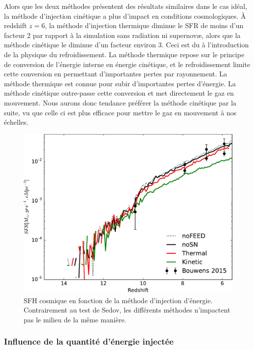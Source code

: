 Alors que les deux méthodes présentent des résultats similaires dans le cas idéal, la méthode d'injection cinétique a plus d'impact en conditions cosmologiques.
À redshift $z=6$, la méthode d'injection thermique diminue le \ac{SFR} de moins d'un facteur 2 par rapport à la simulation sans radiation ni supernovæ, alors que la méthode cinétique le diminue d'un facteur environ 3.
Ceci est du à l'introduction de la physique du refroidissement.
La méthode thermique repose sur le principe de conversion de l'énergie interne en énergie cinétique, et le refroidissement limite cette conversion en permettant d'importantes pertes par rayonnement.
La méthode thermique est connue \citep{navarro_simulations_1993} pour subir d'importantes pertes d'énergie.
La méthode cinétique outre-passe cette conversion et met directement le gaz en mouvement.
Nous aurons donc tendance préférer la méthode cinétique par la suite, vu que celle ci est plus efficace pour mettre le gaz en mouvement à nos échelles.


\begin{figure}
        \includegraphics[width=.95\textwidth]{img/03/sedov/SFRmethode.pdf} 
        \caption[SFH cosmique en fonction de la méthode d'injection d'énergie]{SFH cosmique en fonction de la méthode d'injection d'énergie.
        Contrairement au test de Sedov, les différents méthodes n'impactent pas le milieu de la même manière.
        }
 		\label{fig:sfr_methode}
\end{figure}



\subsubsection{Influence de la quantité d'énergie injectée}
\label{sec:snegy}


